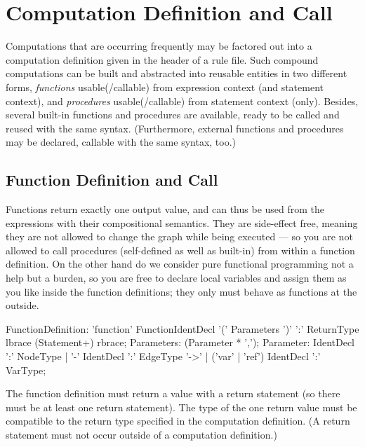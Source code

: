 \section{Computation Definition and Call} \label{sub:compdef}

Computations that are occurring frequently may be factored out into a computation definition given in the header of a rule file.
Such compound computations can be built and abstracted into reusable entities in two different forms, \emph{functions} usable(/callable) from expression context (and statement context), and \emph{procedures} usable(/callable) from statement context (only).
Besides, several built-in functions and procedures are available, ready to be called and reused with the same syntax.
(Furthermore, external functions and procedures may be declared, callable with the same syntax, too.)

\subsection{Function Definition and Call}\label{sub:functions}\label{sec:funccall} 

Functions return exactly one output value, and can thus be used from the expressions with their compositional semantics.
They are side-effect free, meaning they are not allowed to change the graph while being executed ---
so you are not allowed to call procedures (self-defined as well as built-in) from within a function definition.
On the other hand do we consider pure functional programming not a help but a burden, so you are free to declare local variables and assign them as you like inside the function definitions; they only must behave as functions at the outside.

\begin{rail} 
  FunctionDefinition: 
	'function' FunctionIdentDecl '(' Parameters ')' ':' ReturnType\\
	lbrace (Statement+) rbrace;
  Parameters: (Parameter * ',');
  Parameter: IdentDecl ':' NodeType |
  '-' IdentDecl ':' EdgeType '->' |
  ('var' | 'ref') IdentDecl ':' VarType;
\end{rail}

The function definition must return a value with a return statement (so there must be at least one return statement).
The type of the one return value must be compatible to the return type specified in the computation definition.
(A return statement must not occur outside of a computation definition.)

